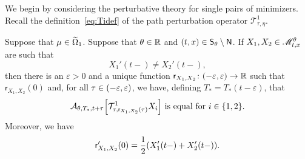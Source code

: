 \documentclass[AHL,Unicode,longabstracts]{cedram}
\newcommand*\ssS{\mathsf{S}}
\newcommand*\ssN{\mathsf{N}}
\newcommand*\sfr{\mathsf{r}}
\newcommand*\scM{\mathscr{M}}
\newcommand*\RR{\mathbb{R}}
\newcommand{\clA}{\mathcal{A}}
\newcommand{\clT}{\mathcal{T}}
\newcommand*\eps{\varepsilon}
\renewcommand*{\to}{\mathchoice{\longrightarrow}{\rightarrow}{\rightarrow}{\rightarrow}}
\let\oldin\in
\renewcommand{\in}{\mathchoice{\oldin}{\oldin}{\,\oldin\,}{\,\oldin\,}}
\let\originalleft\left
\let\originalright\right
\renewcommand{\left}{\mathopen{}\mathclose\bgroup\originalleft}
\renewcommand{\right}{\aftergroup\egroup\originalright}
\newcommand*\RR{\mathbb{R}}
\begin{document}
We begin by considering the perturbative theory for single pairs of minimizers. Recall the definition~\eqref{eq:Tidef} of the path perturbation operator $\clT_{\tau,\eta}^{1}$.

\begin{lemm}\label{lem:differentiate-A}
Suppose that $\mu\in\widetilde{\Omega}_{1}$. Suppose that $\theta\in\RR$ and $(t,x)\in\ssS_{\theta}\setminus\ssN$. If $X_{1},X_{2}\in\scM_{t,x}^{\theta}$ are such that
\begin{equation}\label{eq:derivsnotthesame}
X_{1}'(t-)\ne X_{2}'(t-),
\end{equation}
then there is an $\eps>0$ and a unique function $\sfr_{X_{1},X_{2}}\colon(-\eps,\eps)\to\RR$ such that $\sfr_{X_{1},X_{2}}(0)$ and, for all $\tau\in(-\eps,\eps)$, we have, defining $T_{*}=T_{*}(t-\eps)$, that
\begin{equation}\label{eq:Aequal}
\clA_{\theta,T_{*},t+\tau}\left[\clT_{\tau,\sfr_{X_{1},X_{2}}(\tau)}^{1}X_{i}\right]\text{ is equal for }i\in\{1,2\}.
\end{equation}
Moreover, we have
\begin{equation}\label{eq:RHcondition}
\sfr_{X_{1},X_{2}}'(0)=\frac{1}{2}\left(X_{1}'(t-)+X_{2}'(t-)\right).
\end{equation}
\end{lemm}
\end{document}
